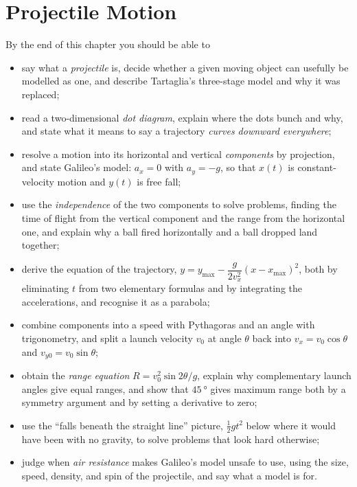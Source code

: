 \documentclass[11pt,twoside,openany]{book}
\begin{document}
\setcounter{chapter}{2}

\chapter{Projectile Motion}

\begin{tcolorbox}[enhanced,colback=white,colframe=teal,sharp corners,boxrule=1pt,
  title=\textbf{In this chapter},coltitle=white,colbacktitle=teal,left=3mm,right=3mm]
By the end of this chapter you should be able to
\begin{itemize}[itemsep=2pt,topsep=2pt]
  \item say what a \emph{projectile} is, decide whether a given moving object can usefully be modelled as one, and describe Tartaglia's three-stage model and why it was replaced;
  \item read a two-dimensional \emph{dot diagram}, explain where the dots bunch and why, and state what it means to say a trajectory \emph{curves downward everywhere};
  \item resolve a motion into its horizontal and vertical \emph{components} by projection, and state Galileo's model: $a_x = 0$ with $a_y = -g$, so that $x(t)$ is constant-velocity motion and $y(t)$ is free fall;
  \item use the \emph{independence} of the two components to solve problems, finding the time of flight from the vertical component and the range from the horizontal one, and explain why a ball fired horizontally and a ball dropped land together;
  \item derive the equation of the trajectory, $y = y_{\max} - \dfrac{g}{2v_x^2}(x - x_{\max})^2$, both by eliminating $t$ from two elementary formulas and by integrating the accelerations, and recognise it as a parabola;
  \item combine components into a speed with Pythagoras and an angle with trigonometry, and split a launch velocity $v_0$ at angle $\theta$ back into $v_x = v_0\cos\theta$ and $v_{y0} = v_0\sin\theta$;
  \item obtain the \emph{range equation} $R = v_0^2\sin 2\theta/g$, explain why complementary launch angles give equal ranges, and show that $\SI{45}{\degree}$ gives maximum range both by a symmetry argument and by setting a derivative to zero;
  \item use the ``falls beneath the straight line'' picture, $\tfrac12 g t^2$ below where it would have been with no gravity, to solve problems that look hard otherwise;
  \item judge when \emph{air resistance} makes Galileo's model unsafe to use, using the size, speed, density, and spin of the projectile, and say what a model is for.
\end{itemize}
\end{tcolorbox}
\end{document}
